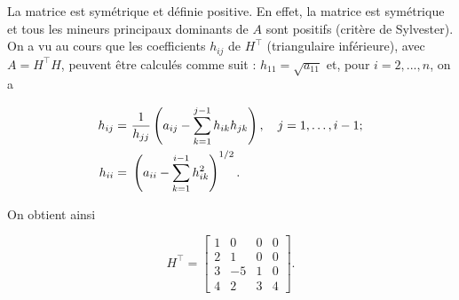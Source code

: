 La matrice est symétrique et définie positive.
En effet, la matrice est symétrique et tous les mineurs principaux dominants de $A$ sont positifs (critère de Sylvester).
On a vu au cours que les coefficients $h_{ij}$ de $H^{\top}$ (triangulaire inférieure), avec $A = H^{\top} H$, peuvent être calculés comme suit : $h_{11} = \sqrt{a_{11}}$ et, pour $i = 2, ... ,n$, on a

\begin{equation}
\label{eq:h}
  \begin{split}
      h_{ij}  = & \  \dfrac{1}{h_{jj}} \left(a_{ij} - \sum_{k = 1}^{j-1} h_{ik} h_{jk}\right), \quad j = 1, \dots, i-1; \\
      h_{ii}  = & \ \left(a_{ii} - \sum_{k = 1}^{i-1} h_{ik}^{2}\right)^{1/2} .
  \end{split}
\end{equation}

On obtient ainsi

\begin{equation*}
  H^{\top} = \begin{bmatrix}
        1  & 0  & 0  & 0  \\
        2  & 1  & 0  & 0  \\
        3  & -5 & 1  & 0  \\
        4  & 2  & 3  & 4 
      \end{bmatrix}
      .
\end{equation*}
